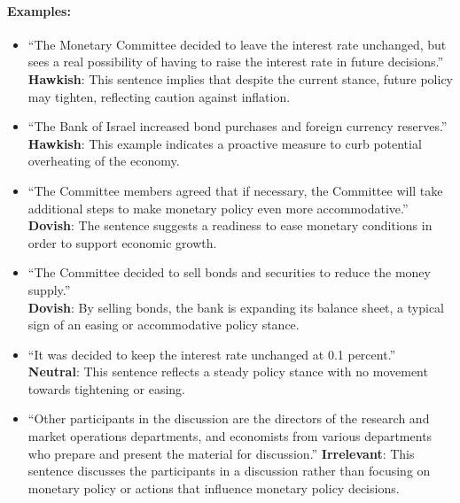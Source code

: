 \paragraph{Examples: }
\begin{itemize}
    \item ``The Monetary Committee decided to leave the interest rate unchanged, but sees a real possibility of having to raise the interest rate in future decisions.''\\
    \textbf{Hawkish}: This sentence implies that despite the current stance, future policy may tighten, reflecting caution against inflation.
    
    \item ``The Bank of Israel increased bond purchases and foreign currency reserves.''\\
    \textbf{Hawkish}: This example indicates a proactive measure to curb potential overheating of the economy.
    
    \item ``The Committee members agreed that if necessary, the Committee will take additional steps to make monetary policy even more accommodative.''\\
    \textbf{Dovish}: The sentence suggests a readiness to ease monetary conditions in order to support economic growth.
    
    \item ``The Committee decided to sell bonds and securities to reduce the money supply.''\\
    \textbf{Dovish}: By selling bonds, the bank is expanding its balance sheet, a typical sign of an easing or accommodative policy stance.
    
    \item ``It was decided to keep the interest rate unchanged at 0.1 percent.''\\
    \textbf{Neutral}: This sentence reflects a steady policy stance with no movement towards tightening or easing.

    \item ``Other participants in the discussion are the directors of the research and market operations departments, and economists from various departments who prepare and present the material for discussion.''
    \textbf{Irrelevant}: This sentence discusses the participants in a discussion rather than focusing on monetary policy or actions that influence monetary policy decisions.
\end{itemize}

